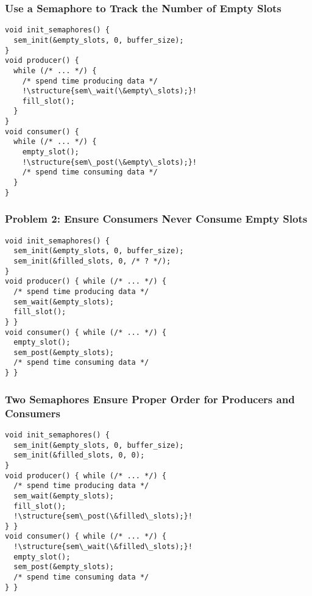   \begin{frame}[fragile]
    \frametitle{Use a Semaphore to Track the Number of Empty Slots}

    \begin{lstlisting}[escapechar=!]
void init_semaphores() {
  sem_init(&empty_slots, 0, buffer_size);
}
void producer() {
  while (/* ... */) {
    /* spend time producing data */
    !\structure{sem\_wait(\&empty\_slots);}!
    fill_slot();
  }
}
void consumer() {
  while (/* ... */) {
    empty_slot();
    !\structure{sem\_post(\&empty\_slots);}!
    /* spend time consuming data */
  }
}
    \end{lstlisting}


  \end{frame}

  \begin{frame}[fragile]
    \frametitle{Problem 2: Ensure Consumers Never Consume Empty Slots}

    \begin{lstlisting}
void init_semaphores() {
  sem_init(&empty_slots, 0, buffer_size);
  sem_init(&filled_slots, 0, /* ? */);
}
void producer() { while (/* ... */) {
  /* spend time producing data */
  sem_wait(&empty_slots);
  fill_slot();
} }
void consumer() { while (/* ... */) {
  empty_slot();
  sem_post(&empty_slots);
  /* spend time consuming data */
} }
    \end{lstlisting}
  \end{frame}

  \begin{frame}[fragile]
    \frametitle{Two Semaphores Ensure Proper Order for Producers and Consumers}

    \begin{lstlisting}[escapechar=!]
void init_semaphores() {
  sem_init(&empty_slots, 0, buffer_size);
  sem_init(&filled_slots, 0, 0);
}
void producer() { while (/* ... */) {
  /* spend time producing data */
  sem_wait(&empty_slots);
  fill_slot();
  !\structure{sem\_post(\&filled\_slots);}!
} }
void consumer() { while (/* ... */) {
  !\structure{sem\_wait(\&filled\_slots);}!
  empty_slot();
  sem_post(&empty_slots);
  /* spend time consuming data */
} }
    \end{lstlisting}
  \end{frame}


